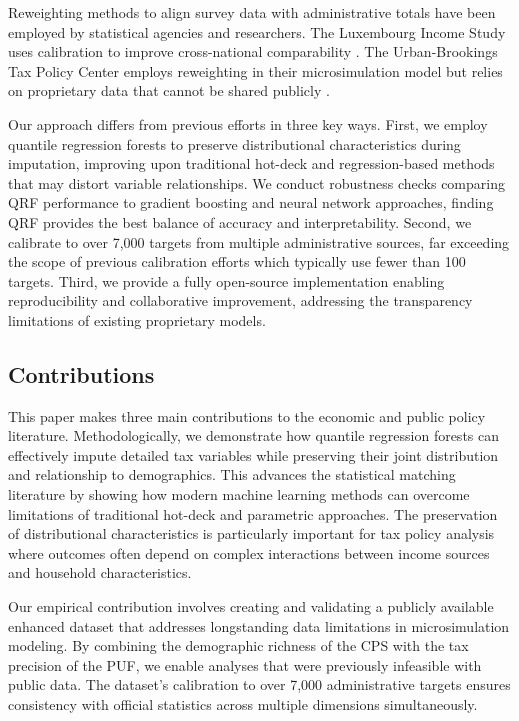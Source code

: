 Reweighting methods to align survey data with administrative totals have been employed by statistical agencies and researchers. The Luxembourg Income Study uses calibration to improve cross-national comparability \citep{jäntti2013}. The Urban-Brookings Tax Policy Center employs reweighting in their microsimulation model but relies on proprietary data that cannot be shared publicly \citep{khitatrakun2016}.

Our approach differs from previous efforts in three key ways. First, we employ quantile regression forests to preserve distributional characteristics during imputation, improving upon traditional hot-deck and regression-based methods that may distort variable relationships. We conduct robustness checks comparing QRF performance to gradient boosting and neural network approaches, finding QRF provides the best balance of accuracy and interpretability. Second, we calibrate to over 7,000 targets from multiple administrative sources, far exceeding the scope of previous calibration efforts which typically use fewer than 100 targets. Third, we provide a fully open-source implementation enabling reproducibility and collaborative improvement, addressing the transparency limitations of existing proprietary models.

\subsection{Contributions}

This paper makes three main contributions to the economic and public policy literature. Methodologically, we demonstrate how quantile regression forests can effectively impute detailed tax variables while preserving their joint distribution and relationship to demographics. This advances the statistical matching literature by showing how modern machine learning methods can overcome limitations of traditional hot-deck and parametric approaches. The preservation of distributional characteristics is particularly important for tax policy analysis where outcomes often depend on complex interactions between income sources and household characteristics.

Our empirical contribution involves creating and validating a publicly available enhanced dataset that addresses longstanding data limitations in microsimulation modeling. By combining the demographic richness of the CPS with the tax precision of the PUF, we enable analyses that were previously infeasible with public data. The dataset's calibration to over 7,000 administrative targets ensures consistency with official statistics across multiple dimensions simultaneously.

